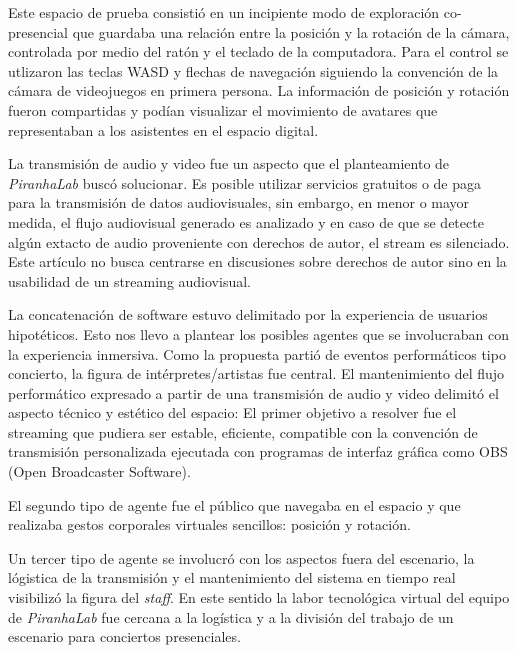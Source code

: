Este espacio de prueba consistió en un incipiente modo de exploración co-presencial que guardaba una relación entre la posición y la rotación de la cámara, controlada por medio del ratón y el teclado de la computadora. Para el control se utlizaron las teclas WASD y flechas de navegación siguiendo la convención de la cámara de videojuegos en primera persona. La información de posición y rotación fueron compartidas y podían visualizar el movimiento de avatares que representaban a los asistentes en el espacio digital. 


La transmisión de audio y video fue un aspecto que el planteamiento de \textit{PiranhaLab} buscó solucionar. Es posible utilizar servicios gratuitos o de paga para la transmisión de datos audiovisuales, sin embargo, en menor o mayor medida, el flujo audiovisual generado es analizado y en caso de que se detecte algún extacto de audio proveniente con derechos de autor, el stream es silenciado. Este artículo no busca centrarse en discusiones sobre derechos de autor sino en la usabilidad de un streaming audiovisual. 

La concatenación de software estuvo delimitado por la experiencia de usuarios hipotéticos. Esto nos llevo a plantear los posibles agentes que se involucraban con la experiencia inmersiva. Como la propuesta partió de eventos performáticos tipo concierto, la figura de intérpretes/artistas fue central. El mantenimiento del flujo performático expresado a partir de una transmisión de audio y video delimitó el aspecto técnico y estético del espacio: El primer objetivo a resolver fue el streaming que pudiera ser estable, eficiente, compatible con la convención de transmisión personalizada ejecutada con programas de interfaz gráfica como OBS (Open Broadcaster Software).

El segundo tipo de agente fue el público que navegaba en el espacio y que realizaba gestos corporales virtuales sencillos: posición y rotación. 

Un tercer tipo de agente se involucró con los aspectos fuera del escenario, la lógistica de la transmisión y el mantenimiento del sistema en tiempo real visibilizó la figura del \textit{staff}. En este sentido la labor tecnológica virtual del equipo de \textit{PiranhaLab} fue cercana a la logística y a la división del trabajo de un escenario para conciertos presenciales. 

